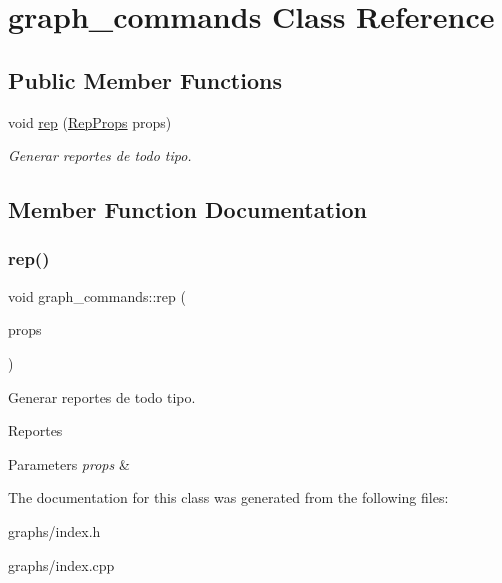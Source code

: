 \hypertarget{classgraph__commands}{}\section{graph\+\_\+commands Class Reference}
\label{classgraph__commands}
\subsection*{Public Member Functions}
\begin{DoxyCompactItemize}
\item 
void \hyperlink{classgraph__commands_a0b916a2e77374903ea346ff795521487}{rep} (\hyperlink{structRepProps}{Rep\+Props} props)
\begin{DoxyCompactList}\small\item\em Generar reportes de todo tipo. \end{DoxyCompactList}\end{DoxyCompactItemize}


\subsection{Member Function Documentation}
\mbox{\label{classgraph__commands_a0b916a2e77374903ea346ff795521487}} 
\subsubsection{\texorpdfstring{rep()}{rep()}}
{\footnotesize\ttfamily void graph\+\_\+commands\+::rep (\begin{DoxyParamCaption}\item[{\hyperlink{structRepProps}{Rep\+Props}}]{props }\end{DoxyParamCaption})}



Generar reportes de todo tipo. 

Reportes 
\begin{DoxyParams}{Parameters}
{\em props} & \\
\hline
\end{DoxyParams}


The documentation for this class was generated from the following files\+:\begin{DoxyCompactItemize}
\item 
graphs/index.\+h\item 
graphs/index.\+cpp\end{DoxyCompactItemize}
